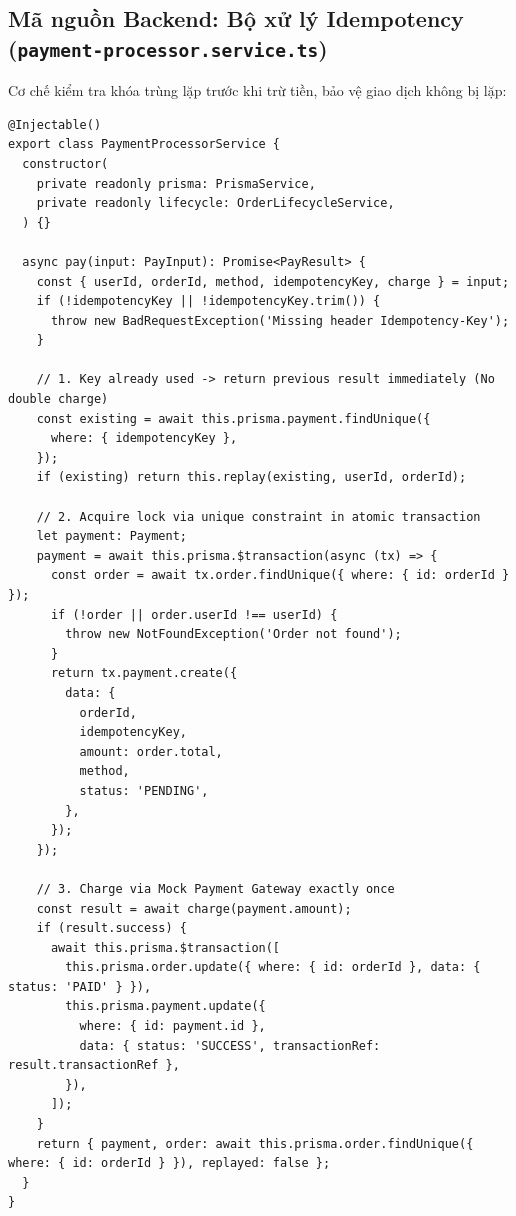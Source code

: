 \documentclass[a4paper]{article}
\begin{document}
\subsection{Mã nguồn Backend: Bộ xử lý Idempotency (\texttt{payment-processor.service.ts})}
Cơ chế kiểm tra khóa trùng lặp trước khi trừ tiền, bảo vệ giao dịch không bị lặp:

\begin{lstlisting}[caption={Idempotency handling in PaymentProcessorService}]
@Injectable()
export class PaymentProcessorService {
  constructor(
    private readonly prisma: PrismaService,
    private readonly lifecycle: OrderLifecycleService,
  ) {}

  async pay(input: PayInput): Promise<PayResult> {
    const { userId, orderId, method, idempotencyKey, charge } = input;
    if (!idempotencyKey || !idempotencyKey.trim()) {
      throw new BadRequestException('Missing header Idempotency-Key');
    }

    // 1. Key already used -> return previous result immediately (No double charge)
    const existing = await this.prisma.payment.findUnique({
      where: { idempotencyKey },
    });
    if (existing) return this.replay(existing, userId, orderId);

    // 2. Acquire lock via unique constraint in atomic transaction
    let payment: Payment;
    payment = await this.prisma.$transaction(async (tx) => {
      const order = await tx.order.findUnique({ where: { id: orderId } });
      if (!order || order.userId !== userId) {
        throw new NotFoundException('Order not found');
      }
      return tx.payment.create({
        data: {
          orderId,
          idempotencyKey,
          amount: order.total,
          method,
          status: 'PENDING',
        },
      });
    });

    // 3. Charge via Mock Payment Gateway exactly once
    const result = await charge(payment.amount);
    if (result.success) {
      await this.prisma.$transaction([
        this.prisma.order.update({ where: { id: orderId }, data: { status: 'PAID' } }),
        this.prisma.payment.update({
          where: { id: payment.id },
          data: { status: 'SUCCESS', transactionRef: result.transactionRef },
        }),
      ]);
    }
    return { payment, order: await this.prisma.order.findUnique({ where: { id: orderId } }), replayed: false };
  }
}
\end{lstlisting}
\end{document}
